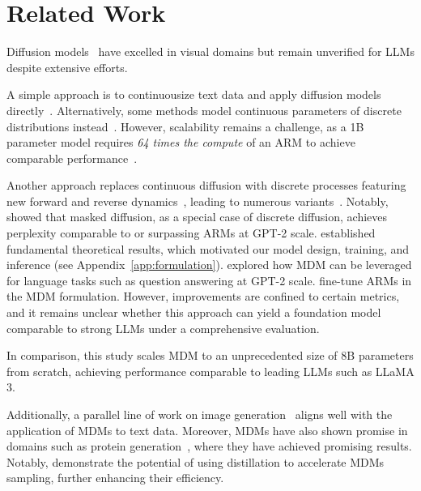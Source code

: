 \section{Related Work}
Diffusion models~\cite{sohl2015deep,ho2020denoising,song2020score} have excelled in visual domains but remain unverified for LLMs despite extensive efforts.

A simple approach is to continuousize text data and apply diffusion models directly~\cite{li2022diffusion,gong2022diffuseq,han2022ssd,strudel2022self,chen2022analog,dieleman2022continuous,richemond2022categorical,wu2023ardiffusion,mahabadi2024tess,ye2023dinoiser}. Alternatively, some methods model continuous parameters of discrete distributions instead~\cite{lou2023reflected,graves2023bayesian,lin2023text,xue2024unifying}. However, scalability remains a challenge, as a 1B parameter model requires \emph{64 times the compute} of an ARM to achieve comparable performance~\cite{gulrajani2024likelihood}.



Another approach replaces continuous diffusion with discrete processes featuring new forward and reverse dynamics~\cite{austin2021structured}, leading to numerous variants~\citep{hoogeboom2021argmax,hoogeboom2021autoregressive,he2022diffusionbert,campbell2022continuous,meng2022concrete,reid2022diffuser,sun2022score,kitouni2023disk,Zheng2023ARD,chen2023fast,ye2023diffusion,gat2024discrete,zheng2024maskeddiffusionmodelssecretly,sahoo2024simple,shi2024simplified}. Notably, \citet{lou2023discrete} showed that masked diffusion, as a special case of discrete diffusion, achieves perplexity comparable to or surpassing ARMs at GPT-2 scale. \citet{ou2024your} established fundamental theoretical results, which motivated our model design, training, and inference (see Appendix~\ref{app:formulation}).  \citet{nie2024scaling} explored how MDM can be leveraged for language tasks such as question answering at GPT-2 scale. \citet{gong2024scaling} fine-tune ARMs in the MDM formulation. However, improvements are confined to certain metrics, and it remains unclear whether this approach can yield a foundation model comparable to strong LLMs under a comprehensive evaluation.



In comparison, this study scales MDM to an unprecedented size of 8B parameters from scratch, achieving performance comparable to leading LLMs such as LLaMA 3.

Additionally, a parallel line of work on image generation~\cite{chang2022maskgit, chang2023muse} aligns well with the application of MDMs to text data. Moreover, MDMs have also shown promise in domains such as protein generation~\citep{wang2024diffusion, wang2024dplm}, where they have achieved promising results. Notably, \citet{kou2024cllms,xu2025show} demonstrate the potential of using distillation to accelerate MDMs sampling, further enhancing their efficiency.